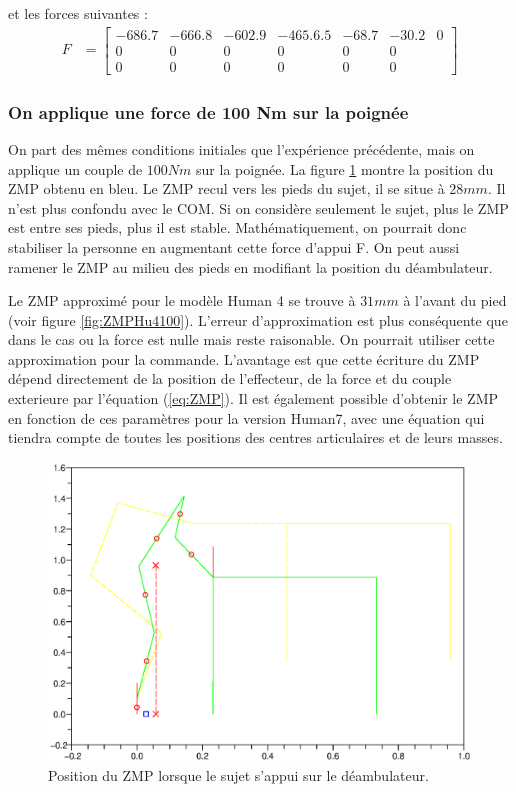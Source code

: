 \documentclass[a4paper, 10pt ]{article}
\begin{document}
\noindent et les forces suivantes :
\begin{align}
F & = 
	\begin{bmatrix}
	    -686.7&-666.8&-602.9&-465.6.5&-68.7&-30.2&0\\
		0&0&0&0&0&0\\
		0&0&0&0&0&0
	\end{bmatrix}
\end{align}


\subsubsection{On applique une force de 100 Nm sur la poignée }

On part des mêmes conditions initiales que l'expérience précédente, mais on applique un couple de $100Nm$ sur la poignée. La figure \ref{fig:ZMP100Nm} montre la position du ZMP obtenu en bleu. Le ZMP recul vers les pieds du sujet, il se situe à $28mm$. Il n'est plus confondu avec le COM. Si on considère seulement le sujet, plus le ZMP est entre ses pieds, plus il est stable. Mathématiquement, on pourrait donc stabiliser la personne en augmentant cette force d'appui F. On peut aussi ramener le ZMP au milieu des pieds en modifiant la position du déambulateur.

Le ZMP approximé pour le modèle Human 4 se trouve à $31mm$ à l'avant du pied (voir figure \ref{fig:ZMPHu4100}). L'erreur d'approximation est plus conséquente que dans le cas ou la force est nulle mais reste raisonable. On pourrait utiliser cette approximation pour la commande. L'avantage est que cette écriture du ZMP dépend directement de la position de l'effecteur, de la force et du couple exterieure par l'équation (\ref{eq:ZMP}). Il est également possible d'obtenir le ZMP en fonction de ces paramètres pour la version Human7, avec une équation qui tiendra compte de toutes les positions des centres articulaires et de leurs masses. 

 \begin{figure}[h]
\centering
\includegraphics[width=0.8\columnwidth]{images/simu/Fext100/ZMP.eps}
\caption{Position du ZMP lorsque le sujet s'appui sur le déambulateur.}
\label{fig:ZMP100Nm}
\end{figure}
\end{document}

